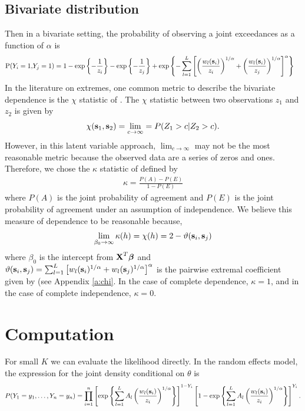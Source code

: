 \documentclass[11pt]{article}
\begin{document}
\subsection{Bivariate distribution}\label{s:bivariate}
Then in a bivariate setting, the probability of observing a joint exceedances as a function of $\alpha$ is
\begin{align} \label{biv}
  \text{P}(Y_i = 1, & Y_j = 1) = 1 - \exp\left\{ - \frac{ 1 }{ z_i } \right\} - \exp \left\{ - \frac{ 1 }{z_j} \right\} + \exp \left\{ - \sum_{ l = 1 }^{ L } \left[ \left( \frac{ w_{ l }(\mbox{\bf s}_i) }{ z_i } \right)^{1/\alpha} + \left( \frac{ w_{l }(\mbox{\bf s}_i)}{z_j} \right)^{1/\alpha} \right]^{\alpha} \right\}
\end{align}
In the literature on extremes, one common metric to describe the bivariate dependence is the $\chi$ statistic of \citet{Coles1999}.
The $\chi$ statistic between two observations $z_1$ and $z_2$ is given by
\begin{align}
  \chi(\mbox{\bf s}_1, \mbox{\bf s}_2) = \lim_{c \rightarrow \infty} = P(Z_1 > c | Z_2 > c).
\end{align}
However, in this latent variable approach, $\lim_{c \rightarrow \infty}$ may not be the most reasonable metric because the observed data are a series of zeros and ones.
Therefore, we chose the $\kappa$ statistic of \citet{Cohen1960} defined by
\begin{align}
  \kappa = \frac{P(A) - P(E)}{1 - P(E)}
\end{align}
where $P(A)$ is the joint probability of agreement and $P(E)$ is the joint probability of agreement under an assumption of independence.
We believe this measure of dependence to be reasonable because,
\begin{align}
  \lim_{\beta_0 \rightarrow \infty} \kappa(h) = \chi(h) = 2 - \vartheta(\mbox{\bf s}_i, \mbox{\bf s}_j)
\end{align}
where $\beta_0$ is the intercept from $\mbox{\bf X}^T\mbox{\boldmath $\beta$}$ and $\vartheta (\mbox{\bf s}_i, \mbox{\bf s}_j) = \sum_{ l = 1 }^{ L } \left[ w_{l}(\mbox{\bf s}_i)^{ 1/\alpha } +  w_{ l}(\mbox{\bf s}_j)^{ 1/\alpha } \right]^\alpha$ is the pairwise extremal coefficient given by \citet{Reich2012} (see Appendix \ref{a:chi}.
In the case of complete dependence, $\kappa = 1$, and in the case of complete independence, $\kappa = 0$.

\section{Computation}\label{s:comp}
For small $K$ we can evaluate the likelihood directly.
In the random effects model, the expression for the joint density conditional on $\theta$ is
\begin{align}
	P(Y_1=y_1,\ldots,Y_n=y_n) = \prod_{ i = 1 }^{ n } \left[ \exp \left\{ \sum_{ l = 1 }^{L} A_l \left( \frac{ w_{l}(\mbox{\bf s}_i) }{ z_i } \right)^{ 1/\alpha} \right\} \right]^{ 1 - Y_i } \left[ 1 - \exp \left\{ \sum_{ l = 1 }^{L} A_l \left( \frac{ w_{l}(\mbox{\bf s}_i) }{ z_i } \right)^{ 1/\alpha} \right\} \right]^{ Y_i }.
\end{align}
\end{document}
